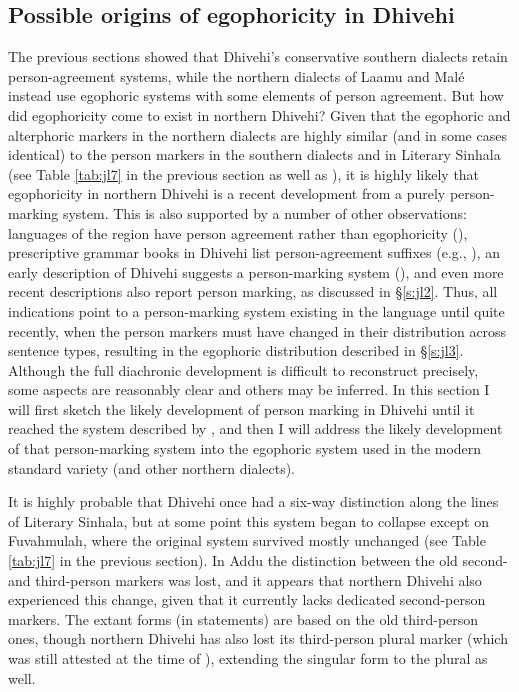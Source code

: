 \documentclass[output=paper]{langsci/langscibook}
\begin{document}
\subsection{Possible origins of egophoricity in Dhivehi}\label{s:jl4-3}

The previous sections showed that Dhivehi’s conservative southern dialects retain person-agreement systems, while the northern dialects of Laamu and Malé instead use egophoric systems with some elements of person agreement. But how did egophoricity come to exist in northern Dhivehi? Given that the egophoric and alterphoric markers in the northern dialects are highly similar (and in some cases identical) to the person markers in the southern dialects and in Literary Sinhala (see Table \ref{tab:jl7} in the previous section as well as \citealt[168–175]{Fritz2002}), it is highly likely that egophoricity in northern Dhivehi is a recent development from a purely person-marking system. This is also supported by a number of other observations: languages of the region have person agreement rather than egophoricity (\citealt{Hock2016}), prescriptive grammar books in Dhivehi list person-agreement suffixes (e.g., \citealt{Ahmad1970}), an early description of Dhivehi suggests a person-marking system (\citealt{Geiger1919}), and even more recent descriptions also report person marking, as discussed in §‎\ref{s:jl2}. Thus, all indications point to a person-marking system existing in the language until quite recently, when the person markers must have changed in their distribution across sentence types, resulting in the egophoric distribution described in §\ref{s:jl3}. Although the full diachronic development is difficult to reconstruct precisely, some aspects are reasonably clear and others may be inferred. In this section I will first sketch the likely development of person marking in Dhivehi until it reached the system described by \cite{Ahmad1970}, and then I will address the likely development of that person-marking system into the egophoric system used in the modern standard variety (and other northern dialects).


It is highly probable that Dhivehi once had a six-way distinction along the lines of Literary Sinhala, but at some point this system began to collapse except on Fuvahmulah, where the original system survived mostly unchanged (see Table \ref{tab:jl7} in the previous section). In Addu the distinction between the old second- and third-person markers was lost, and it appears that northern Dhivehi also experienced this change, given that it currently lacks dedicated second-person markers. The extant forms (in statements) are based on the old third-person ones, though northern Dhivehi has also lost its third-person plural marker (which was still attested at the time of \citealt{Geiger1919}), extending the singular form to the plural as well. 
\end{document}
